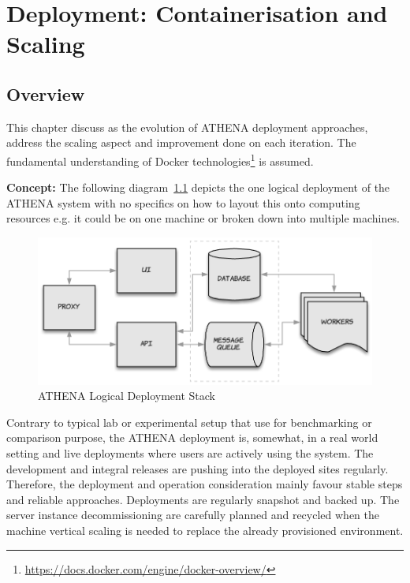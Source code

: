 \chapter{Deployment: Containerisation and Scaling}

\label{Chapter3}

\section{Overview}
This chapter discuss as the evolution of ATHENA deployment approaches, address the scaling aspect and improvement done on each iteration. The fundamental understanding of Docker technologies\footnote{\url{https://docs.docker.com/engine/docker-overview/}} is assumed.

\noindent \textbf{Concept:} \quad The following diagram~\ref{fig:deployStack} depicts the one logical deployment of the ATHENA system with no specifics on how to layout this onto computing resources e.g. it could be on one machine or broken down into multiple machines.

\begin{figure}[H]
\centering
\includegraphics[width=0.5\paperwidth]{Figures/ATHENA_deploy_stack}
\decoRule
\caption[ATHENA Deployment Stack]{ATHENA Logical Deployment Stack}
\label{fig:deployStack}
\end{figure}

Contrary to typical lab or experimental setup that use for benchmarking or comparison purpose, the ATHENA deployment is, somewhat, in a real world setting and live deployments where users are actively using the system. The development and integral releases are pushing into the deployed sites regularly. Therefore, the deployment and operation consideration mainly favour stable steps and reliable approaches. Deployments are regularly snapshot and backed up. The server instance decommissioning are carefully planned and recycled when the machine vertical scaling is needed to replace the already provisioned environment. 


